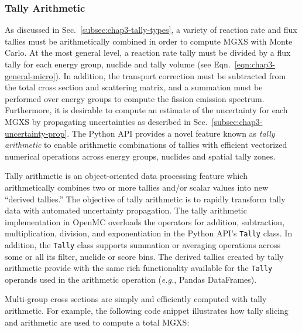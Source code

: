 \subsubsection{Tally Arithmetic}
\label{subsubsec:chap4-tally-arithmetic}

As discussed in Sec.~\ref{subsec:chap3-tally-types}, a variety of reaction rate and flux tallies must be arithmetically combined in order to compute \ac{MGXS} with Monte Carlo. At the most general level, a reaction rate tally must be divided by a flux tally for each energy group, nuclide and tally volume (see Eqn.~\ref{eqn:chap3-general-micro}). In addition, the transport correction must be subtracted from the total cross section and scattering matrix, and a summation must be performed over energy groups to compute the fission emission spectrum. Furthermore, it is desirable to compute an estimate of the uncertainty for each \ac{MGXS} by propagating uncertainties as described in Sec.~\ref{subsec:chap3-uncertainty-prop}. The Python \ac{API} provides a novel feature known as \textit{tally arithmetic} to enable arithmetic combinations of tallies with efficient vectorized numerical operations across energy groups, nuclides and spatial tally zones.

Tally arithmetic is an object-oriented data processing feature which arithmetically combines two or more tallies and/or scalar values into new ``derived tallies.'' The objective of tally arithmetic is to rapidly transform tally data with automated uncertainty propagation. The tally arithmetic implementation in OpenMC overloads the operators for addition, subtraction, multiplication, division, and exponentiation in the Python \ac{API}'s \texttt{Tally} class. In addition, the \texttt{Tally} class supports summation or averaging operations across some or all its filter, nuclide or score bins.  The derived tallies created by tally arithmetic provide with the same rich functionality available for the \texttt{Tally} operands used in the arithmetic operation (\textit{e.g.}, Pandas DataFrames).

Multi-group cross sections are simply and efficiently computed with tally arithmetic. For example, the following code snippet illustrates how tally slicing and arithmetic are used to compute a total \ac{MGXS}:



